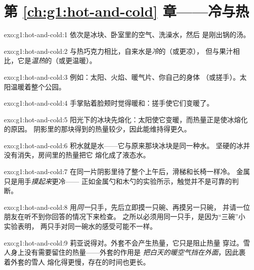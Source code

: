 \section*{第 \ref{ch:g1:hot-and-cold} 章——冷与热}

\begin{solution}{exo:g1:hot-and-cold:1}
依次是冰块、卧室里的空气、洗澡水，然后
是刚出锅的汤。
\end{solution}

\begin{solution}{exo:g1:hot-and-cold:2}
与热巧克力相比，自来水是\emph{冷}的（或更凉），
但与果汁相比，它是\emph{温热}的（或更温暖）。
\end{solution}

\begin{solution}{exo:g1:hot-and-cold:3}
例如：太阳、火焰、暖气片、你自己的身体
（或搓手）。太阳温暖着整个公园。
\end{solution}

\begin{solution}{exo:g1:hot-and-cold:4}
手掌贴着脸颊时觉得暖和：搓手使它们变暖了。
\end{solution}

\begin{solution}{exo:g1:hot-and-cold:5}
阳光下的冰块先熔化：太阳使它变暖，而热量正是使冰熔化的原因。
阴影里的那块得到的热量较少，因此能维持得更久。
\end{solution}

\begin{solution}{exo:g1:hot-and-cold:6}
积水就是水——它与原来那块冰块是同一种水。
坚硬的冰并没有消失，房间里的热量把它
熔化成了液态水。
\end{solution}

\begin{solution}{exo:g1:hot-and-cold:7}
在同一片阴影里待了整个上午后，滑梯和长椅一样冷。
金属只是用手\emph{摸起来}更冷——
正如金属勺和木勺的实验所示，触觉并不是可靠的判断。
\end{solution}

\begin{solution}{exo:g1:hot-and-cold:8}
用\emph{同一}只手，先后立即摸一只碗、再摸另一只碗，
并请一位朋友在听不到你回答的情况下来检查。
之所以必须用同一只手，是因为“三碗”小实验表明，
两只手对同一碗水的感受可能不一样。
\end{solution}

\begin{solution}{exo:g1:hot-and-cold:9}
莉亚说得对。外套不会产生热量，它只是阻止热量
穿过。雪人身上没有需要留住的热量——外套的作用是
\emph{把白天的暖空气挡在外面}，因此裹着外套的雪人
熔化得更慢，存在的时间也更长。
\end{solution}
